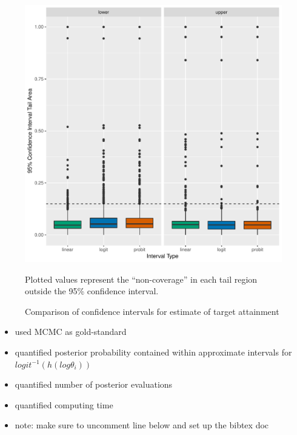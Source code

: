 \documentclass{article}\usepackage[]{graphicx}\usepackage[]{color}
\makeatletter
\def\maxwidth{ %
  \ifdim\Gin@nat@width>\linewidth
    \linewidth
  \else
    \Gin@nat@width
  \fi
}
\newenvironment{knitrout}{}{} %
\makeatother
\begin{document}
\begin{figure}
\caption{Comparison of confidence intervals for estimate of target attainment}
\begin{knitrout}
\color{fgcolor}
\includegraphics[width=\maxwidth]{figure/unnamed-chunk-3-1} 

\end{knitrout}
\footnotesize
Plotted values represent the ``non-coverage'' in each tail region outside the 95\% confidence interval.
\end{figure}


\begin{itemize}
\item used MCMC as gold-standard
\item quantified posterior probability contained within approximate intervals for $logit^{-1}(h(log \theta_i))$
\item quantified number of posterior evaluations
\item quantified computing time
\item note: make sure to uncomment line below and set up the bibtex doc
\end{itemize}
\end{document}
